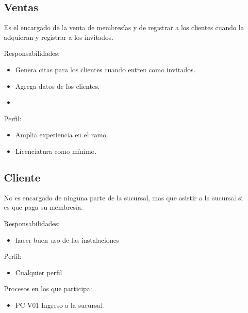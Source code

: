 \begin{Usuario}{\subsection{Ventas}}{
		Es el encargado de la venta de membresías y de registrar a los clientes cuando la adquieran y registrar a los invitados.
	}
	\item[Responsabilidades:] \cdtEmpty
	\begin{itemize}
		\item Genera citas para los clientes cuando entren como invitados.
		\item Agrega datos de los clientes.
		\item 
	\end{itemize}
	
	\item[Perfil:] \cdtEmpty
	\begin{itemize}
		\item Amplia experiencia en el ramo.
		\item Licenciatura como mínimo.
	\end{itemize}
	
\end{Usuario}


\begin{Usuario}{\subsection{Cliente}}{
		No es encargado de ninguna parte de la sucursal, mas que asistir a la sucursal si es que paga su membresía.
	}
			\item[Responsabilidades:] \cdtEmpty
		\begin{itemize}
			\item hacer buen uso de las instalaciones
		\end{itemize}
		
		\item[Perfil:] \cdtEmpty
		\begin{itemize}
			\item Cualquier perfil
		\end{itemize}
		\item[Procesos en los que participa:] \cdtEmpty
		\begin{itemize}
			\item PC-V01 Ingreso a la sucursal.
			
		\end{itemize}

\end{Usuario}


